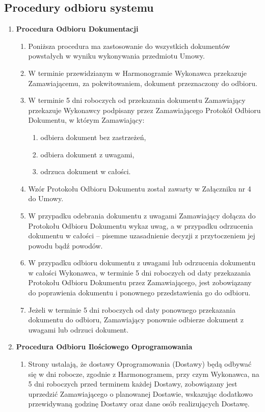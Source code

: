 \documentclass{article}
\begin{document}
\subsection{Procedury odbioru systemu}
\begin{enumerate}
\item \textbf{Procedura Odbioru Dokumentacji}
\begin{enumerate}
\item Poniższa procedura ma zastosowanie do wszystkich dokumentów powstałych w wyniku wykonywania przedmiotu Umowy.
\item W terminie przewidzianym w Harmonogramie Wykonawca przekazuje Zamawiającemu, za pokwitowaniem, dokument przeznaczony do odbioru.
\item W terminie 5 dni roboczych od przekazania dokumentu Zamawiający przekazuje Wykonawcy podpisany przez Zamawiającego Protokół Odbioru Dokumentu, w którym Zamawiający:
\begin{enumerate}
\item odbiera dokument bez zastrzeżeń,
\item odbiera dokument z uwagami,
\item odrzuca dokument w całości.
\end{enumerate}
\item Wzór Protokołu Odbioru Dokumentu został zawarty w Załączniku nr 4 do Umowy.
\item W przypadku odebrania dokumentu z uwagami Zamawiający dołącza do Protokołu Odbioru Dokumentu wykaz uwag, a w przypadku odrzucenia dokumentu w całości – pisemne uzasadnienie decyzji z przytoczeniem jej powodu bądź powodów.
\item W przypadku odbioru dokumentu z uwagami lub odrzucenia dokumentu w całości Wykonawca, w terminie 5 dni roboczych od daty przekazania Protokołu Odbioru Dokumentu przez Zamawiającego, jest zobowiązany do poprawienia dokumentu i ponownego przedstawienia go do odbioru.
\item Jeżeli w terminie 5 dni roboczych od daty ponownego przekazania dokumentu do odbioru,  Zamawiający ponownie odbierze dokument z uwagami lub odrzuci dokument.
\end{enumerate}
\item \textbf{Procedura Odbioru Ilościowego Oprogramowania}
\begin{enumerate}
\item Strony ustalają, że dostawy Oprogramowania (Dostawy) będą odbywać się w dni robocze, zgodnie z Harmonogramem, przy czym Wykonawca, na 5 dni roboczych przed terminem każdej Dostawy, zobowiązany jest uprzedzić Zamawiającego o planowanej Dostawie, wskazując dodatkowo przewidywaną godzinę Dostawy oraz dane osób realizujących Dostawę.

\end{enumerate}
\end{enumerate}
\end{document}
